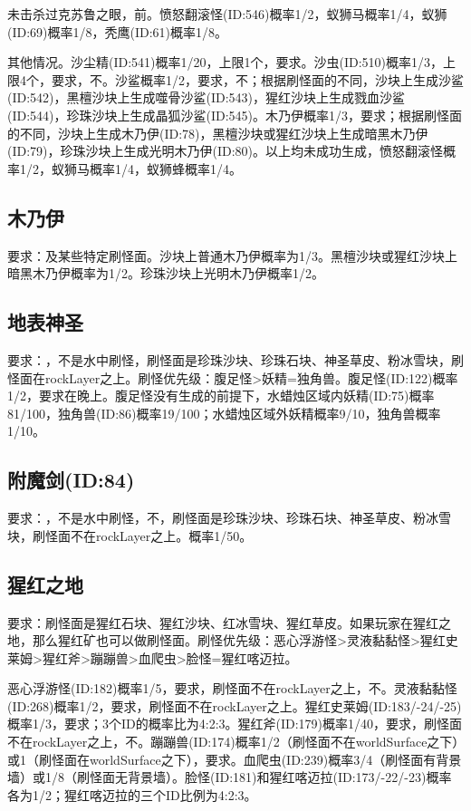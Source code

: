 未击杀过克苏鲁之眼，前。愤怒翻滚怪(ID:546)概率1/2，蚁狮马概率1/4，蚁狮(ID:69)概率1/8，秃鹰(ID:61)概率1/8。

其他情况。沙尘精(ID:541)概率1/20，上限1个，要求。沙虫(ID:510)概率1/3，上限4个，要求，不。沙鲨概率1/2，要求，不；根据刷怪面的不同，沙块上生成沙鲨(ID:542)，黑檀沙块上生成噬骨沙鲨(ID:543)，猩红沙块上生成戮血沙鲨(ID:544)，珍珠沙块上生成晶狐沙鲨(ID:545)。木乃伊概率1/3，要求；根据刷怪面的不同，沙块上生成木乃伊(ID:78)，黑檀沙块或猩红沙块上生成暗黑木乃伊(ID:79)，珍珠沙块上生成光明木乃伊(ID:80)。以上均未成功生成，愤怒翻滚怪概率1/2，蚁狮马概率1/4，蚁狮蜂概率1/4。

\subsection{木乃伊}
要求：及某些特定刷怪面。沙块上普通木乃伊概率为1/3。黑檀沙块或猩红沙块上暗黑木乃伊概率为1/2。珍珠沙块上光明木乃伊概率1/2。

\subsection{地表神圣}
要求：，不是水中刷怪，刷怪面是珍珠沙块、珍珠石块、神圣草皮、粉冰雪块，刷怪面在rockLayer之上。刷怪优先级：腹足怪>妖精=独角兽。腹足怪(ID:122)概率1/2，要求在晚上。腹足怪没有生成的前提下，水蜡烛区域内妖精(ID:75)概率81/100，独角兽(ID:86)概率19/100；水蜡烛区域外妖精概率9/10，独角兽概率1/10。

\subsection{附魔剑(ID:84)}
要求：，不是水中刷怪，不，刷怪面是珍珠沙块、珍珠石块、神圣草皮、粉冰雪块，刷怪面不在rockLayer之上。概率1/50。

\subsection{猩红之地}
要求：刷怪面是猩红石块、猩红沙块、红冰雪块、猩红草皮。如果玩家在猩红之地，那么猩红矿也可以做刷怪面。刷怪优先级：恶心浮游怪>灵液黏黏怪>猩红史莱姆>猩红斧>蹦蹦兽>血爬虫>脸怪=猩红喀迈拉。

恶心浮游怪(ID:182)概率1/5，要求，刷怪面不在rockLayer之上，不。灵液黏黏怪(ID:268)概率1/2，要求，刷怪面不在rockLayer之上。猩红史莱姆(ID:183/-24/-25)概率1/3，要求；3个ID的概率比为4:2:3。猩红斧(ID:179)概率1/40，要求，刷怪面不在rockLayer之上，不。蹦蹦兽(ID:174)概率1/2（刷怪面不在worldSurface之下）或1（刷怪面在worldSurface之下），要求。血爬虫(ID:239)概率3/4（刷怪面有背景墙）或1/8（刷怪面无背景墙）。脸怪(ID:181)和猩红喀迈拉(ID:173/-22/-23)概率各为1/2；猩红喀迈拉的三个ID比例为4:2:3。

